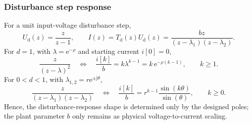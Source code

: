 \begin{frame}
    \frametitle{Disturbance step response}
    For a unit input-voltage disturbance step,
    \begin{equation}
        U_\mathrm{d}(z)=\frac{z}{z-1},
        \qquad
        I(z)=T_\mathrm{d}(z)U_\mathrm{d}(z)
        =\frac{bz}{(z-\lambda_1)(z-\lambda_2)} .
        \label{eq:disturbance_step_z}
    \end{equation}\pause%
    For $d=1$, with $\lambda=\mathrm{e}^{-\rho}$ and starting current $i[0]=0$,
    \begin{equation}
        \frac{z}{(z-\lambda)^2}
        \quad\Longleftrightarrow\quad
        \frac{i[k]}{b}
        =k\lambda^{k-1}
        =k\,\mathrm{e}^{-\rho(k-1)},\qquad k\ge 1.
        \label{eq:disturbance_sequence_d1}
    \end{equation}\pause%
    For $0<d<1$, with $\lambda_{1,2}=r\mathrm{e}^{\pm\mathrm{j}\theta}$,
    \begin{equation}
        \frac{z}{(z-\lambda_1)(z-\lambda_2)}
        \quad\Longleftrightarrow\quad
        \frac{i[k]}{b}
        =
        r^{k-1}\frac{\sin(k\theta)}{\sin(\theta)},
        \qquad k\ge 0 .
        \label{eq:disturbance_sequence_complex}
    \end{equation}\pause%
    Hence, the disturbance-response shape is determined only by the designed poles; the plant parameter $b$ only remains as physical voltage-to-current scaling.
\end{frame}


